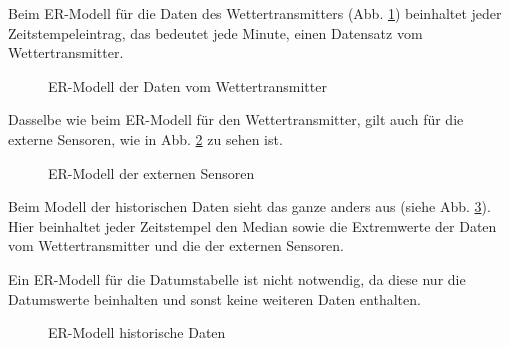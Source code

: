 Beim ER-Modell für die Daten des Wettertransmitters (Abb. \ref{img:ER_Modell Wettertransmitter}) beinhaltet jeder Zeitstempeleintrag, das bedeutet jede Minute, einen Datensatz vom Wettertransmitter.

\begin{figure}[h!]
	\centering
	\caption{ER-Modell der Daten vom Wettertransmitter}
	\label{img:ER_Modell Wettertransmitter}
\end{figure}

Dasselbe wie beim ER-Modell für den Wettertransmitter, gilt auch für die externe Sensoren, wie in Abb. \ref{img:ER_Modell externe Sensoren} zu sehen ist.
\begin{figure}[h!]
	\centering
	\caption{ER-Modell der externen Sensoren}
	\label{img:ER_Modell externe Sensoren}
\end{figure}

Beim Modell der historischen Daten sieht das ganze anders aus (siehe Abb. \ref{img:ER_Modell historische Daten}). Hier beinhaltet jeder Zeitstempel den Median sowie die Extremwerte der Daten vom Wettertransmitter und die der externen Sensoren.

Ein ER-Modell für die Datumstabelle ist nicht notwendig, da diese nur die Datumswerte beinhalten und sonst keine weiteren Daten enthalten.

\begin{figure}[h!]
	\centering
	\caption{ER-Modell historische Daten}
	\label{img:ER_Modell historische Daten}
\end{figure}

